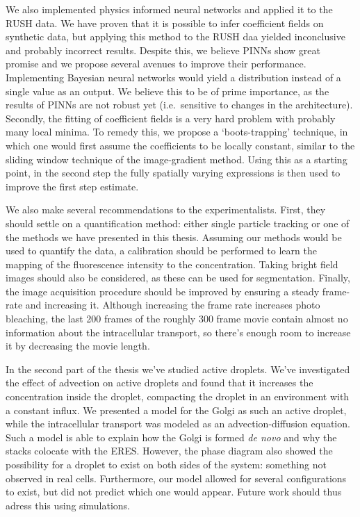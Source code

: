 \documentclass{Dissertate}
\begin{document}
We also implemented physics informed neural networks and applied it to
the RUSH data. We have proven that it is possible to infer coefficient
fields on synthetic data, but applying this method to the RUSH daa
yielded inconclusive and probably incorrect results. Despite this, we
believe PINNs show great promise and we propose several avenues to
improve their performance. Implementing Bayesian neural networks would
yield a distribution instead of a single value as an output. We believe
this to be of prime importance, as the results of PINNs are not robust
yet (i.e.~sensitive to changes in the architecture). Secondly, the
fitting of coefficient fields is a very hard problem with probably many
local minima. To remedy this, we propose a `boots-trapping' technique,
in which one would first assume the coefficients to be locally constant,
similar to the sliding window technique of the image-gradient method.
Using this as a starting point, in the second step the fully spatially
varying expressions is then used to improve the first step estimate.

We also make several recommendations to the experimentalists. First,
they should settle on a quantification method: either single particle
tracking or one of the methods we have presented in this thesis.
Assuming our methods would be used to quantify the data, a calibration
should be performed to learn the mapping of the fluorescence intensity
to the concentration. Taking bright field images should also be
considered, as these can be used for segmentation. Finally, the image
acquisition procedure should be improved by ensuring a steady frame-rate
and increasing it. Although increasing the frame rate increases photo
bleaching, the last 200 frames of the roughly 300 frame movie contain
almost no information about the intracellular transport, so there's
enough room to increase it by decreasing the movie length.

In the second part of the thesis we've studied active droplets. We've
investigated the effect of advection on active droplets and found that
it increases the concentration inside the droplet, compacting the
droplet in an environment with a constant influx. We presented a model
for the Golgi as such an active droplet, while the intracellular
transport was modeled as an advection-diffusion equation. Such a model
is able to explain how the Golgi is formed \emph{de novo} and why the
stacks colocate with the ERES. However, the phase diagram also showed
the possibility for a droplet to exist on both sides of the system:
something not observed in real cells. Furthermore, our model allowed for
several configurations to exist, but did not predict which one would
appear. Future work should thus adress this using simulations.
\end{document}
